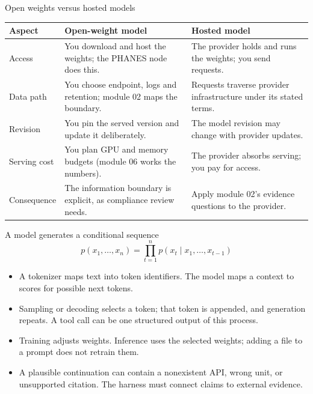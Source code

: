 \documentclass[aspectratio=169,11pt]{beamer}
\begin{document}
\begin{frame}[t,fragile]{Open weights versus hosted models}
\fontsize{10.5}{12.5}\selectfont\setlength{\tabcolsep}{4pt}\renewcommand{\arraystretch}{1.15}
\begin{tabular}{>{\raggedright\arraybackslash}p{}>{\raggedright\arraybackslash}p{}>{\raggedright\arraybackslash}p{}}
\toprule
\textbf{Aspect} & \textbf{Open-weight model} & \textbf{Hosted model} \\ \midrule
Access & You download and host the weights; the PHANES node does this. & The provider holds and runs the weights; you send requests. \\[2pt]
Data path & You choose endpoint, logs and retention; module 02 maps the boundary. & Requests traverse provider infrastructure under its stated terms. \\[2pt]
Revision & You pin the served version and update it deliberately. & The model revision may change with provider updates. \\[2pt]
Serving cost & You plan GPU and memory budgets (module 06 works the numbers). & The provider absorbs serving; you pay for access. \\[2pt]
Consequence & The information boundary is explicit, as compliance review needs. & Apply module 02's evidence questions to the provider. \\[2pt]
\bottomrule\end{tabular}\par\vspace{2mm}
\end{frame}
\begin{frame}[t,fragile]{A model generates a conditional sequence}
\[p(x_1,\ldots,x_n)=\prod_{t=1}^{n}p(x_t\mid x_1,\ldots,x_{t-1})\]
\fontsize{11.5}{14}\selectfont
\begin{itemize}\setlength{\itemsep}{2mm}
\item A tokenizer maps text into token identifiers. The model maps a context to scores for possible next tokens.
\item Sampling or decoding selects a token; that token is appended, and generation repeats. A tool call can be one structured output of this process.
\item Training adjusts weights. Inference uses the selected weights; adding a file to a prompt does not retrain them.
\item A plausible continuation can contain a nonexistent API, wrong unit, or unsupported citation. The harness must connect claims to external evidence.
\end{itemize}
\end{frame}
\end{document}
